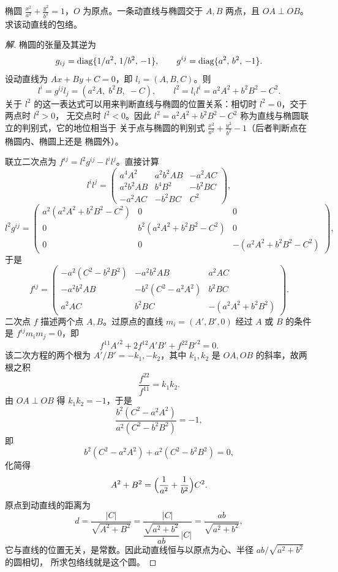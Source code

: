 \begin{example}
椭圆 $\frac{x^2}{a^2}+\frac{y^2}{b^2}=1$，$O$ 为原点。一条动直线与椭圆交于 $A,B$ 两点，且
$OA\perp OB$。求该动直线的包络。
\end{example}

\begin{proof}[解]
椭圆的张量及其逆为
\[
g_{ij}=\operatorname{diag}\{1/a^2,\,1/b^2,\,-1\},\qquad
g^{ij}=\operatorname{diag}\{a^2,\,b^2,\,-1\}.
\]
设动直线为 $Ax+By+C=0$，即 $l_i=(A,B,C)$。则
\[
l^i=g^{ij}l_j=(a^2A,\;b^2B,\;-C),\qquad
l^2=l_il^i=a^2A^2+b^2B^2-C^2 .
\]
关于 $l^2$ 的这一表达式可以用来判断直线与椭圆的位置关系：相切时 $l^2=0$，交于两点时 $l^2>0$，
无交点时 $l^2<0$。因此 $l^2=a^2A^2+b^2B^2-C^2$ 称为直线与椭圆联立的判别式，它的地位相当于
关于点与椭圆的判别式 $\frac{x^2}{a^2}+\frac{y^2}{b^2}-1$（后者判断点在椭圆内、椭圆上还是
椭圆外）。

联立二次点为 $f^{ij}=l^2g^{ij}-l^il^j$。直接计算
\[
l^il^j=\begin{pmatrix}
a^4A^2 & a^2b^2AB & -a^2AC\\
a^2b^2AB & b^4B^2 & -b^2BC\\
-a^2AC & -b^2BC & C^2
\end{pmatrix},
\]
\[
l^2g^{ij}=\begin{pmatrix}
a^2(a^2A^2+b^2B^2-C^2) & 0 & 0\\
0 & b^2(a^2A^2+b^2B^2-C^2) & 0\\
0 & 0 & -(a^2A^2+b^2B^2-C^2)
\end{pmatrix},
\]
于是
\[
f^{ij}=\begin{pmatrix}
-a^2(C^2-b^2B^2) & -a^2b^2AB & a^2AC\\
-a^2b^2AB & -b^2(C^2-a^2A^2) & b^2BC\\
a^2AC & b^2BC & -(a^2A^2+b^2B^2)
\end{pmatrix}.
\]
二次点 $f$ 描述两个点 $A,B$。过原点的直线 $m_i=(A',B',0)$ 经过 $A$ 或 $B$ 的条件是
$f^{ij}m_im_j=0$，即
\[
f^{11}A'^2+2f^{12}A'B'+f^{22}B'^2=0 .
\]
该二次方程的两个根为 $A'/B'=-k_1,-k_2$，其中 $k_1,k_2$ 是 $OA,OB$ 的斜率，故两根之积
\[
\frac{f^{22}}{f^{11}}=k_1k_2 .
\]
由 $OA\perp OB$ 得 $k_1k_2=-1$，于是
\[
\frac{b^2(C^2-a^2A^2)}{a^2(C^2-b^2B^2)}=-1,
\]
即
\[
b^2(C^2-a^2A^2)+a^2(C^2-b^2B^2)=0,
\]
化简得
\[
A^2+B^2=\Bigl(\frac{1}{a^2}+\frac{1}{b^2}\Bigr)C^2 .
\]
原点到动直线的距离为
\[
d=\frac{|C|}{\sqrt{A^2+B^2}}
=\frac{|C|}{\dfrac{\sqrt{a^2+b^2}}{ab}\,|C|}
=\frac{ab}{\sqrt{a^2+b^2}},
\]
它与直线的位置无关，是常数。因此动直线恒与以原点为心、半径 $ab/\sqrt{a^2+b^2}$ 的圆相切，
所求包络线就是这个圆。
\end{proof}


